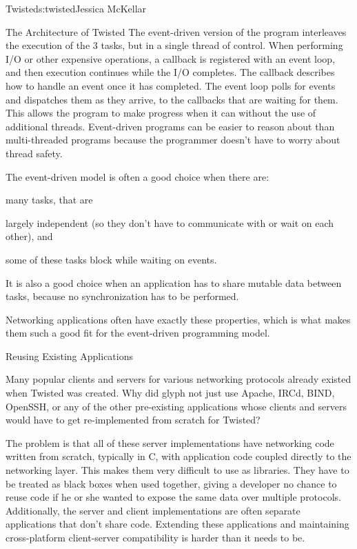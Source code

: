 \begin{aosachapter}{Twisted}{s:twisted}{Jessica McKellar}
\begin{aosasect1}{The Architecture of Twisted}
The event-driven version of the program interleaves the execution of the 3
tasks, but in a single thread of control. When performing I/O or other expensive
operations, a callback is registered with an event loop, and then execution
continues while the I/O completes. The callback describes how to handle an event
once it has completed. The event loop polls for events and dispatches them as
they arrive, to the callbacks that are waiting for them. This allows the program
to make progress when it can without the use of additional threads. Event-driven
programs can be easier to reason about than multi-threaded programs because the
programmer doesn't have to worry about thread safety.

The event-driven model is often a good choice when there are:

\begin{aosaenumerate}

\item many tasks, that are

\item largely independent (so they don't have to communicate with or
  wait on each other), and

\item some of these tasks block while waiting on events.

\end{aosaenumerate}

It is also a good choice when an application has to share mutable data
between tasks, because no synchronization has to be performed.

Networking applications often have exactly these properties, which is what
makes them such a good fit for the event-driven programming model.

\begin{aosasect2}{Reusing Existing Applications}

Many popular clients and servers for various networking protocols already
existed when Twisted was created. Why did glyph not just use Apache, IRCd, BIND,
OpenSSH, or any of the other pre-existing applications whose clients and servers
would have to get re-implemented from scratch for Twisted?

The problem is that all of these server implementations have networking code
written from scratch, typically in C, with application code coupled directly to
the networking layer. This makes them very difficult to use as libraries. 
They have to be treated as black boxes when used together, giving a developer no
chance to reuse code if he or she wanted to expose the same data over multiple
protocols. Additionally, the server and client implementations are often
separate applications that don't share code. Extending these applications and
maintaining cross-platform client-server compatibility is harder than it needs
to be.


\end{aosasect2}
\end{aosasect1}
\end{aosachapter}
